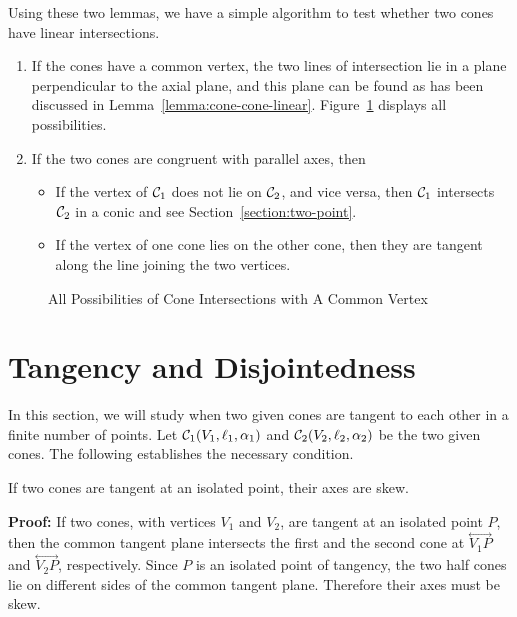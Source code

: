      Using these two lemmas, we have a simple algorithm to test whether two 
cones have linear intersections.
\begin{enumerate}
     \item If the cones have a common vertex, the two lines of intersection
          lie in a plane perpendicular to the axial plane, and this plane
          can be found as has been discussed in 
          Lemma~\ref{lemma:cone-cone-linear}.  
          Figure~\ref{fig:two-lines-and-one-line} displays all possibilities.
     \item If the two cones are congruent with parallel axes, then
     \begin{itemize}
          \item If the vertex of ${\cal C}_1$ does not lie on ${\cal C}_2$, and
               vice versa, then ${\cal C}_1$ intersects ${\cal C}_2$ in a conic
               and see Section~\ref{section:two-point}.
          \item If the vertex of one cone lies on the other cone, then they
               are tangent along the line joining the two vertices.
     \end{itemize}
\end{enumerate}
\begin{figure}[h]
\vspace{10cm}
\caption{All Possibilities of Cone Intersections with A Common Vertex}
\label{fig:two-lines-and-one-line}
\end{figure}


\section{Tangency and Disjointedness}
\label{section:tangency-disjoint}
     In this section, we will study when two given cones are tangent to each
other in a finite number of points.  Let ${\cal C}_1(V_1,\ell_1,\alpha_1)$ and
${\cal C}_2(V_2,\ell_2,\alpha_2)$ be the two given cones.  The following 
establishes the necessary condition.

\begin{lemma}
\label{lemma:point-tangent-has-skew-axes}
     If two cones are tangent at an isolated point, their axes are skew.
\end{lemma}
{\bf Proof:}  If two cones, with vertices $V_1$ and $V_2$, are tangent at an
isolated point $P$, then the common tangent plane intersects the first and the
second cone at $\stackrel{\longleftrightarrow}{V_1P}$ and
$\stackrel{\longleftrightarrow}{V_2P}$, respectively.  Since $P$ is an isolated
point of tangency, the two half cones lie on different sides of the common
tangent plane.  Therefore their axes must be skew.\ \ \ \QED

